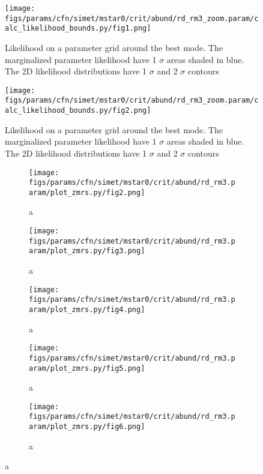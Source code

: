\documentclass[twocolumn]{article}
\begin{document}
\begin{figure}[H]
  \center\texttt{[image: figs/params/cfn/simet/mstar0/crit/abund/rd\_rm3\_zoom.param/calc\_likelihood\_bounds.py/fig1.png]}
  \caption{Likelihood on a parameter grid around the best mode. The marginalized parameter likelihood have
    1 $\sigma$ areas shaded in blue. The 2D likelihood distributions have 1 $\sigma$  and 2 $\sigma$ contours}
  \label{fig:basic_rd:likelihood}
\end{figure}

\begin{figure}[H]
  \center\texttt{[image: figs/params/cfn/simet/mstar0/crit/abund/rd\_rm3\_zoom.param/calc\_likelihood\_bounds.py/fig2.png]}
  \caption{Likelihood on a parameter grid around the best mode. The marginalized parameter likelihood have
    1 $\sigma$ areas shaded in blue. The 2D likelihood distributions have 1 $\sigma$  and 2 $\sigma$ contours}
  \label{fig:basic_rd:likelihood}
\end{figure}

\begin{figure}
  \begin{subfigure}{.5\textwidth}
    \centering\texttt{[image: figs/params/cfn/simet/mstar0/crit/abund/rd\_rm3.param/plot\_zmrs.py/fig2.png]}
    \caption{a}
  \end{subfigure}
  \begin{subfigure}{.5\textwidth}
    \centering\texttt{[image: figs/params/cfn/simet/mstar0/crit/abund/rd\_rm3.param/plot\_zmrs.py/fig3.png]}
    \caption{a}
  \end{subfigure}
  \begin{subfigure}{.5\textwidth}
    \centering\texttt{[image: figs/params/cfn/simet/mstar0/crit/abund/rd\_rm3.param/plot\_zmrs.py/fig4.png]}
    \caption{a}
  \end{subfigure}%
  \begin{subfigure}{.5\textwidth}
    \centering\texttt{[image: figs/params/cfn/simet/mstar0/crit/abund/rd\_rm3.param/plot\_zmrs.py/fig5.png]}
    \caption{a}
  \end{subfigure}
  \begin{subfigure}{.5\textwidth}
    \centering\texttt{[image: figs/params/cfn/simet/mstar0/crit/abund/rd\_rm3.param/plot\_zmrs.py/fig6.png]}
    \caption{a}
  \end{subfigure}
\end{figure}
\clearpage
\end{document}
